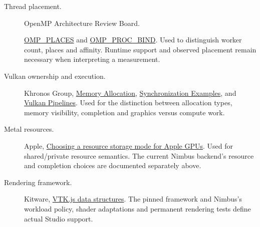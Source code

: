\begin{description}
\item[Thread placement.]
OpenMP Architecture Review Board.\par
\href{https://www.openmp.org/spec-html/5.1/openmpse62.html}{OMP\_PLACES}
and \href{https://www.openmp.org/spec-html/5.0/openmpse52.html}{OMP\_PROC\_BIND}.
Used to distinguish worker count, places and affinity. Runtime support and
observed placement remain necessary when interpreting a measurement.

\item[Vulkan ownership and execution.]
Khronos Group, \href{https://docs.vulkan.org/guide/latest/memory_allocation.html}{Memory Allocation},
\href{https://docs.vulkan.org/guide/latest/synchronization_examples.html}{Synchronization Examples},
and \href{https://docs.vulkan.org/spec/latest/chapters/pipelines.html}{Vulkan Pipelines}.
Used for the distinction between allocation types, memory visibility,
completion and graphics versus compute work.

\item[Metal resources.]
Apple, \href{https://developer.apple.com/documentation/metal/choosing-a-resource-storage-mode-for-apple-gpus}{Choosing a resource storage mode for Apple GPUs}.
Used for shared/private resource semantics. The current Nimbus backend's
resource and completion choices are documented separately above.

\item[Rendering framework.]
Kitware, \href{https://kitware.github.io/vtk-js/docs/structures.html}{VTK.js data structures}.
The pinned framework and Nimbus's workload policy, shader adaptations and
permanent rendering tests define actual Studio support.
\end{description}
